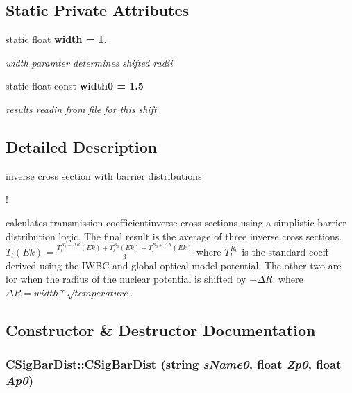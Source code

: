 \subsection*{Static Private Attributes}
\begin{CompactItemize}
\item 
static float \bf{width} = 1.\label{classCSigBarDist_07e67e476a5452df83f9a348ab8a23c8}

\begin{CompactList}\small\item\em width paramter determines shifted radii \item\end{CompactList}\item 
static float const \bf{width0} = 1.5\label{classCSigBarDist_9bbbb75c2633d7dbad4e5e85264636d1}

\begin{CompactList}\small\item\em results readin from file for this shift \item\end{CompactList}\end{CompactItemize}


\subsection{Detailed Description}
inverse cross section with barrier distributions 

!

calculates transmission coefficientinverse cross sections using a simplistic barrier distribution logic. The final result is the average of three inverse cross sections. $ T_{l}(Ek) = \frac{T_{l}^{R_{0}-\Delta R}(Ek) + T_{l}^{R_{0}}(Ek) + T_{l}^{R_{0}+\Delta R}(Ek)}{3} $ where $ T_{l}^{R_{0}}$ is the standard coeff derived using the IWBC and global optical-model potential. The other two are for when the radius of the nuclear potential is shifted by $ \pm \Delta R $. where $ \Delta R = width*\sqrt{temperature} $. 



\subsection{Constructor \& Destructor Documentation}
\subsubsection{\setlength{\rightskip}{0pt plus 5cm}CSig\-Bar\-Dist::CSig\-Bar\-Dist (string {\em s\-Name0}, float {\em Zp0}, float {\em Ap0})}\label{classCSigBarDist_5fef91947df17b399099110d91b42529}


